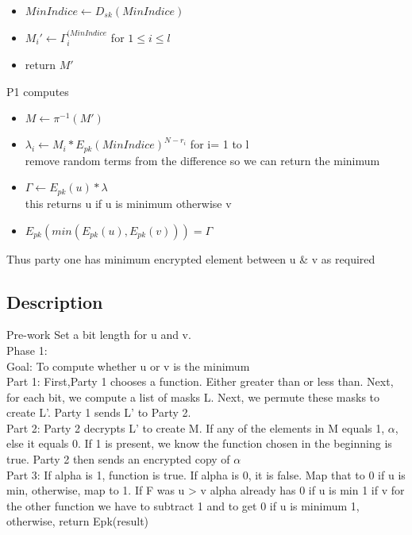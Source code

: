 \documentclass[10pt]{article} %
\begin{document}
\begin{itemize}
	\item $MinIndice \gets D_{sk}(MinIndice)$
	\item $M_i' \gets \Gamma_i^{(MinIndice}$ for $1\le i \le l$
	\item return $M'$
\end{itemize}

P1 computes

\begin{itemize}
\item $M \gets \pi^{-1}(M')$
\item $\lambda _i \gets M_i * E_{pk}(MinIndice)^{N-r_i}$ for i= 1 to l
\\remove random terms from the difference so we can return the minimum
\item $\Gamma \gets E_{pk}(u)*\lambda$
\\this returns u if u is minimum otherwise v
\item $E_{pk}(min(E_{pk}(u),E_{pk}(v))) = \Gamma$
\end{itemize}

Thus party one has minimum encrypted element between u \& v as required
\subsection*{\textbf{Description}}
Pre-work
Set a bit length for u and v.\\
Phase 1:\\
	Goal:
    To compute whether u or v is the minimum\\
    
	Part 1:
	First,Party 1 chooses a function. Either greater than or less than.
	Next, for each bit, we compute a list of masks L.
	Next, we permute these masks to create L'.
    Party 1 sends L' to Party 2.\\

	Part 2:
	Party 2 decrypts L' to create M.
    If any of the elements in M equals 1, $\alpha$, else it equals 0. If 1 is present, we know the function chosen in the 		beginning is true.
    Party 2 then sends an encrypted copy of $\alpha$ \\

	Part 3:
	If alpha is 1, function is true. If alpha is 0, it is false. Map that to 0 if u is min, otherwise, map to 1.
    If F was u > v alpha already has 0 if u is min 1 if v
for the other function we have to subtract 1 and to get 0 if u is minimum 1, otherwise, return Epk(result)\\
\end{document}
